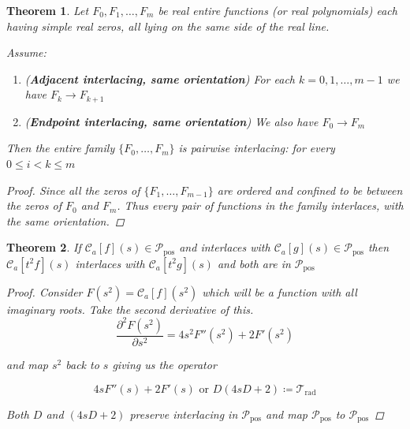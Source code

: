 \documentclass[11pt]{article}
\theoremstyle{breakdef}
\newtheorem{theorem}{Theorem}[section]
\begin{document}
\begin{theorem}
Let $F_0,F_1,\dots,F_m$ be real entire functions (or real polynomials) each having simple real zeros, all lying on
the same side of the real line. 

Assume:
\begin{enumerate}
    \item[\textup{(i)}] (\textbf{Adjacent interlacing, same
    orientation}) For each $k=0,1,\dots,m-1$ we have 
    $F_k \to F_{k+1}$
   
    \item[\textup{(ii)}] (\textbf{Endpoint interlacing, same
    orientation}) We also have $F_0 \to F_m$
    
\end{enumerate}



Then the entire family $\{F_0,\dots,F_m\}$ is \emph{pairwise
interlacing}: for every $0\le i < k \le m$ 
\begin{proof}
Since all the zeros of $\{F_1,\dots,F_{m-1}\}$ are ordered and confined to be between the zeros of $F_0$ and $F_m$.
Thus every pair of functions in the family interlaces, with the same
orientation.
\end{proof}

\end{theorem}

\begin{theorem}
If $\mathcal{C}_{a}[f](s) \in \mathcal{P}_{\mathrm{pos}}$ and interlaces with 
$\mathcal{C}_{a}[g](s) \in \mathcal{P}_{\mathrm{pos}}$ 
then $\mathcal{C}_{a}[t^2 f](s)$ interlaces with 
$\mathcal{C}_{a}[t^2 g](s)$ and both are in $\mathcal{P}_{\mathrm{pos}}$

\begin{proof}
Consider
$F(s^2) = \mathcal{C}_{a}[f](s^2)$ which will be a function with all imaginary roots.
Take the second derivative of this.
\begin{equation}
\frac{\partial^2F\left(s^2\right)}{\partial s^2} = 4 s^2 F''\left(s^2\right)+2 F'\left(s^2\right)
\end{equation}

and map $s^2$ back to $s$ giving us the operator

\begin{equation}
4 s F''(s)+2 F'(s) \text{ or }  D(4sD + 2) \coloneqq  \mathcal{T}_{\text{rad}}
\end{equation}


Both $D$ and $(4sD + 2)$ preserve interlacing in $\mathcal{P}_{\mathrm{pos}}$ and map $\mathcal{P}_{\mathrm{pos}}$ to $\mathcal{P}_{\mathrm{pos}}$

\end{proof}
\end{theorem}
\end{document}
